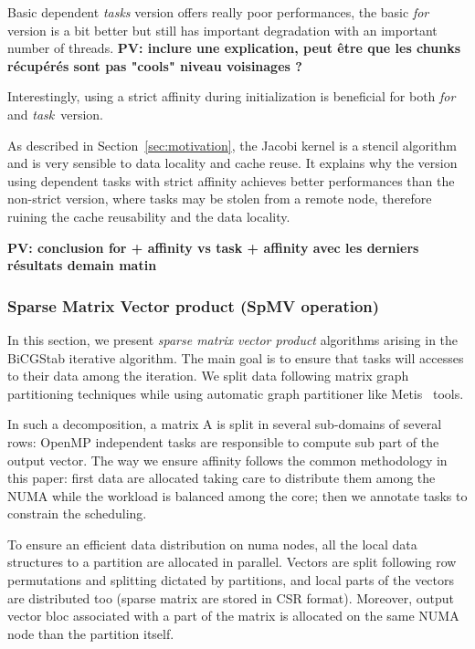 \documentclass{Styles/llncs}
\newcommand{\PV}[1]{{\color{purple}\bfseries PV: #1}}
\begin{document}
Basic dependent \emph{tasks} version offers really poor performances, the basic
\emph{for} version is a bit better but still has important degradation with an
important number of threads.
\PV{inclure une explication, peut être que les chunks récupérés sont pas "cools" niveau voisinages ?}

Interestingly, using a strict affinity during initialization is beneficial for both \emph{for} and \emph{task} version.

As described in Section~\ref{sec:motivation}, the Jacobi kernel is a stencil algorithm
and is very sensible to data locality and cache reuse. It explains why the
version using dependent tasks with strict affinity achieves better performances than the non-strict version,
where tasks may be stolen from a remote node, therefore ruining the cache reusability
and the data locality.

\PV{conclusion for + affinity vs task + affinity avec les derniers résultats demain matin}



\subsubsection{Sparse Matrix Vector product (SpMV operation)}

In this section, we present \textit{sparse matrix vector product} algorithms arising in the BiCGStab iterative algorithm. The main goal is to ensure that tasks will accesses to their data among the iteration.
We split data following matrix graph partitioning techniques \cite{Saad:2003:IMS:829576} while using automatic graph partitioner like Metis~\cite{metis} tools. 

In such a decomposition, a matrix A is split in several sub-domains of several rows: OpenMP independent tasks are responsible to compute sub part of the output vector. The way we ensure affinity follows the common methodology in this paper: first data are allocated taking care to distribute them among the NUMA while the workload is balanced among the core; then we annotate tasks to constrain the scheduling.

To ensure an efficient data distribution on numa nodes, all the local data structures to a partition are allocated in parallel. Vectors are split following row permutations and splitting dictated by partitions, and local parts of the vectors are distributed too (sparse matrix are stored in CSR format). Moreover, output vector bloc associated with a part of the matrix is allocated on the same NUMA node than the partition itself.
\end{document}
